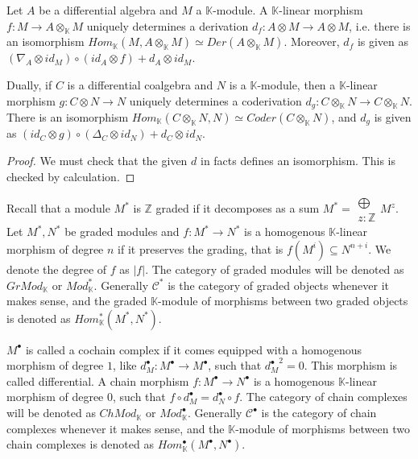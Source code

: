 \documentclass[../thesis.tex]{subfiles}
\begin{document}
            \begin{proposition}\label{prop: free-derivation}
                Let $A$ be a differential algebra and $M$ a $\mathbb{K}$-module. A $\mathbb{K}$-linear morphism $f:M\rightarrow A\otimes_{\mathbb{K}} M$ uniquely determines a derivation $d_f:A\otimes M\rightarrow A\otimes M$, i.e. there is an isomorphism $Hom_{\mathbb{K}}(M,A\otimes_{\mathbb{K}}M)\simeq Der(A\otimes_{\mathbb{K}}M)$. Moreover, $d_f$ is given as $(\nabla_A\otimes id_M)\circ (id_A\otimes f) + d_A\otimes id_M$.

                Dually, if $C$ is a differential coalgebra and $N$ is a $\mathbb{K}$-module, then a $\mathbb{K}$-linear morphism $g:C\otimes N\rightarrow N$ uniquely determines a coderivation $d_g:C\otimes_{\mathbb{K}}N\rightarrow C\otimes_{\mathbb{K}}N$. There is an isomorphism $Hom_{\mathbb{K}}(C\otimes_{\mathbb{K}}N,N)\simeq Coder(C\otimes_{\mathbb{K}}N)$, and $d_g$ is given as $(id_C\otimes g)\circ (\Delta_C\otimes id_N) + d_C\otimes id_N$.
            \end{proposition}

            \begin{proof}
                We must check that the given $d$ in facts defines an isomorphism. This is checked by calculation. 
            \end{proof}

            Recall that a module $M^*$ is $\mathbb{Z}$ graded if it decomposes as a sum $M^* = \substack{\bigoplus \\ z:\mathbb{Z}}M^z$. Let $M^*,N^*$ be graded modules and $f:M^*\rightarrow N^*$ is a homogenous $\mathbb{K}$-linear morphism of degree $n$ if it preserves the grading, that is $f(M^i) \subseteq N^{n+i}$. We denote the degree of $f$ as $|f|$. The category of graded modules will be denoted as $GrMod_{\mathbb{K}}$ or $Mod_\mathbb{K}^*$. Generally $\mathcal{C}^*$ is the category of graded objects whenever it makes sense, and the graded $\mathbb{K}$-module of morphisms between two graded objects is denoted as $Hom_{\mathbb{K}}^*(M^*,N^*)$.
            

            $M^{\bullet}$ is called a cochain complex if it comes equipped with a homogenous morphism of degree $1$, like $d_M^{\bullet}:M^{\bullet}\rightarrow M^{\bullet}$, such that ${d_M^{\bullet}}^2=0$. This morphism is called differential. A chain morphism $f: M^{\bullet}\rightarrow N^{\bullet}$ is a homogenous $\mathbb{K}$-linear morphism of degree $0$, such that $f\circ d_M^{\bullet} = d_N^{\bullet}\circ f$. The category of chain complexes will be denoted as $ChMod_{\mathbb{K}}$ or $Mod_\mathbb{K}^\bullet$. Generally $\mathcal{C}^\bullet$ is the category of chain complexes whenever it makes sense, and the $\mathbb{K}$-module of morphisms between two chain complexes is denoted as $Hom_{\mathbb{K}}^{\bullet}(M^{\bullet},N^{\bullet})$.
\end{document}
